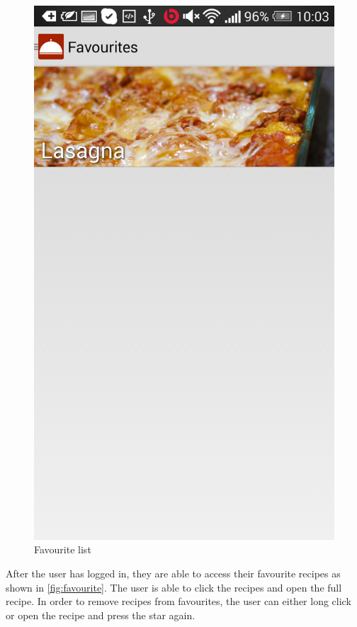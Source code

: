 \begin{figure}[H]
\begin{minipage}[t]{0.5\columnwidth}
\centering
\includegraphics[width=0.7\columnwidth]{img/screenshots/finalfavourite.png}
\caption{Favourite list\label{fig:favourite}}
\end{minipage}
\end{figure}

 After the user has logged in, they are able to access their favourite recipes as shown in \autoref{fig:favourite}. The user is able to click the recipes and open the full recipe. In order to remove recipes from favourites, the user can either long click or open the recipe and press the star again.